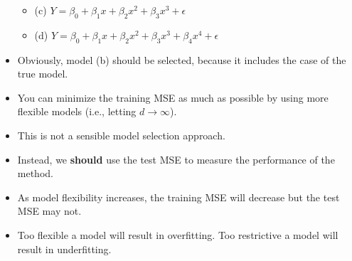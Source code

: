 \documentclass[11pt]{article}
\begin{document}
\begin{itemize}
\begin{itemize}
    \item (c) $Y = \beta_{0} + \beta_{1}x + \beta_{2}x^{2} + \beta_{3}x^{3} + \epsilon $
    \item (d) $Y = \beta_{0} + \beta_{1}x + \beta_{2}x^{2} + \beta_{3}x^{3} + \beta_{4}x^{4} + \epsilon $
  \end{itemize}
  \item Obviously, model (b) should be selected, because it includes the case of the true model.
  \item You can minimize the training MSE as much as possible by using more flexible models (i.e., letting $d \to \infty$).
  \item This is not a sensible model selection approach.
  \item Instead, we \textbf{should} use the test MSE to measure the performance of the method.
  \item As model flexibility increases, the training MSE will decrease but the test MSE may not.
  \item Too flexible a model will result in overfitting. Too restrictive a model will result in underfitting.
\end{itemize}
\end{document}
